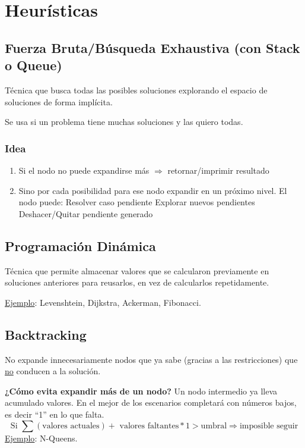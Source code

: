 \documentclass{article}
\begin{document}
\newpage
\section{Heurísticas}
\subsection{Fuerza Bruta/Búsqueda Exhaustiva (con Stack o Queue)}
\begin{tcolorbox}[title=Definición]
Técnica que busca todas las posibles soluciones explorando el espacio de soluciones de forma implícita.
\end{tcolorbox}
Se usa si un problema tiene muchas soluciones y las quiero todas.

\subsubsection*{Idea}
\begin{enumerate}
    \item Si el nodo no puede expandirse más $\Rightarrow$ retornar/imprimir resultado
    \item Sino por cada posibilidad para ese nodo expandir en un próximo nivel. El nodo puede:
        \subitem Resolver caso pendiente
        \subitem Explorar nuevos pendientes
        \subitem Deshacer/Quitar pendiente generado
\end{enumerate}

\subsection{Programación Dinámica}
\begin{tcolorbox}[title=Definición]
Técnica que permite almacenar valores que se calcularon previamente en soluciones anteriores para reusarlos, en vez de calcularlos repetidamente.
\end{tcolorbox}
\underline{Ejemplo}: Levenshtein, Dijkstra, Ackerman, Fibonacci.

\subsection{Backtracking}
\begin{tcolorbox}[title=Definición]
No expande innecesariamente nodos que ya sabe (gracias a las restricciones) que \underline{no} conducen a la solución.
\end{tcolorbox}
\textbf{¿Cómo evita expandir más de un nodo?}
Un nodo intermedio ya lleva acumulado valores. 
En el mejor de los escenarios completará con números bajos, es decir “1” en lo que falta.
\begin{equation*}
    \text{Si }\sum{}{} \left(\text{valores actuales}\right) + \text{ valores faltantes} * 1 > \text{umbral} \Rightarrow \text{imposible seguir}
\end{equation*}
\underline{Ejemplo}: N-Queens.
\end{document}
